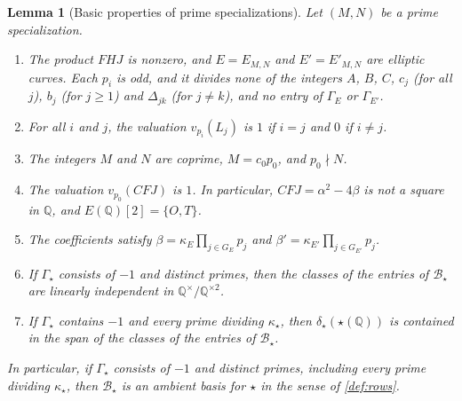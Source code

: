 \documentclass[12pt,oneside,openany]{book}
\theoremstyle{definition}
\theoremstyle{plain}
\numberwithin{equation}{chapter}
\theoremstyle{plain}
\newtheorem{lemma}[lemma]{Lemma}
\theoremstyle{definition}
\theoremstyle{remark}
\newcommand{\Q}{\mathbb Q}
\newcommand{\sqgp}[1]{#1^{\times}/#1^{\times2}}
\newcommand{\cB}{\mathcal B}
\begin{document}
\begin{lemma}[Basic properties of prime specializations]\label{lem:prime-spec-basic}
Let $(M,N)$ be a prime specialization.
\begin{enumerate}[label=(\alph*),ref=(\alph*)]
\item\label{item:psb-nonzero} The product $FHJ$ is nonzero, and $E=E_{M,N}$ and $E'=E'_{M,N}$ are elliptic curves. Each $p_i$ is odd, and it divides none of the integers $A$, $B$, $C$, $c_j$ (for all $j$), $b_j$ (for $j\ge1$) and $\Delta_{jk}$ (for $j\ne k$), and no entry of $\Gamma_E$ or $\Gamma_{E'}$.
\item\label{item:psb-valuations} For all $i$ and $j$, the valuation $v_{p_i}(L_j)$ is $1$ if $i=j$ and $0$ if $i\ne j$.
\item\label{item:psb-gcd} The integers $M$ and $N$ are coprime, $M=c_0p_0$, and $p_0\nmid N$.
\item\label{item:psb-torsion} The valuation $v_{p_0}(CFJ)$ is $1$. In particular, $CFJ=\alpha^2-4\beta$ is not a square in $\Q$, and $E(\Q)[2]=\{O,T\}$.
\item\label{item:psb-beta} The coefficients satisfy $\beta=\kappa_E\prod_{j\in G_E}p_j$ and $\beta'=\kappa_{E'}\prod_{j\in G_{E'}}p_j$.
\item\label{item:psb-independent} If $\Gamma_\star$ consists of $-1$ and distinct primes, then the classes of the entries of $\cB_\star$ are linearly independent in $\sqgp\Q$.
\item\label{item:psb-support} If $\Gamma_\star$ contains $-1$ and every prime dividing $\kappa_\star$, then $\delta_\star(\star(\Q))$ is contained in the span of the classes of the entries of $\cB_\star$.
\end{enumerate}
In particular, if $\Gamma_\star$ consists of $-1$ and distinct primes, including every prime dividing $\kappa_\star$, then $\cB_\star$ is an ambient basis for $\star$ in the sense of \cref{def:rows}.
\end{lemma}
\end{document}
